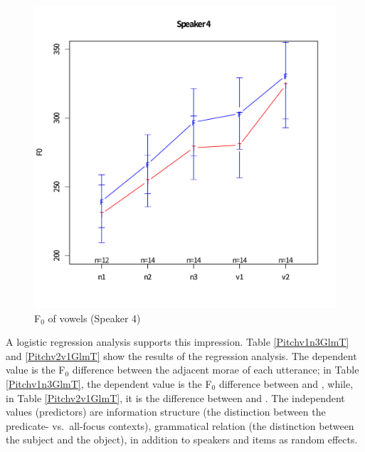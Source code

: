 \begin{figure}
	\begin{center}
	\includegraphics[width=.5\textwidth]{figure/yomiage04.pdf}
	\caption{F$_{0}$ of vowels (Speaker 4)}
	\label{Int:fig:Sp4}
	\end{center}
\end{figure}


A logistic regression analysis supports this impression.
Table \ref{Pitchv1n3GlmT} and \ref{Pitchv2v1GlmT} show the results of the regression analysis.
The dependent value is the F$_{0}$ difference between the adjacent morae of each utterance;
in Table \ref{Pitchv1n3GlmT}, the dependent value is the F$_{0}$ difference between  and ,
while, in Table \ref{Pitchv2v1GlmT},
it is the difference between  and .
The independent values (predictors) are information structure (the distinction between the predicate- vs.~all-focus contexts),
grammatical relation (the distinction between the subject and the object),
in addition to speakers and items as random effects.

